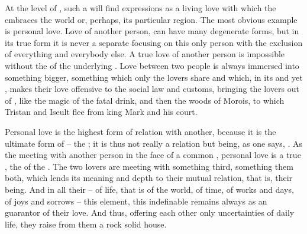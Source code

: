 \pa\label{pa:persloveB} \mine At the level of , such a 
will find {expressions} as a living love with which the  embraces the
world or, perhaps, its particular region.  The most obvious example is personal
love.   Love of another
person, can have many degenerate forms, but in its true form it is never a
separate focusing on this only person with the exclusion of everything and
everybody else. A true love of another person is impossible without the
 of the underlying . Love between two people is always
immersed into something bigger, something which only the lovers share and which,
in its  and yet , makes their love offensive
to the social law and customs, bringing the lovers out of , like
the magic of the fatal drink, and then the woods of Morois, to which Tristan and
Iseult flee from king Mark and his court.


Personal love is the highest form of relation with another, because it is the
ultimate form of  --  the ; it is thus not
really a relation but being, as one says, .  As the meeting
with another person in the face of a common , personal love is a
true , the  of  the .  The
two lovers are meeting with something third, something  them both, which lends
its meaning and depth to their mutual relation, that is, their being. And in all
their  -- of life, that is of the world, of time, of works and days,
of joys and sorrows -- this  element, this indefinable  remains
always  as an  guarantor of their  love. 
And thus, offering each other only  uncertainties of daily life,
they raise from them a rock solid house. 


